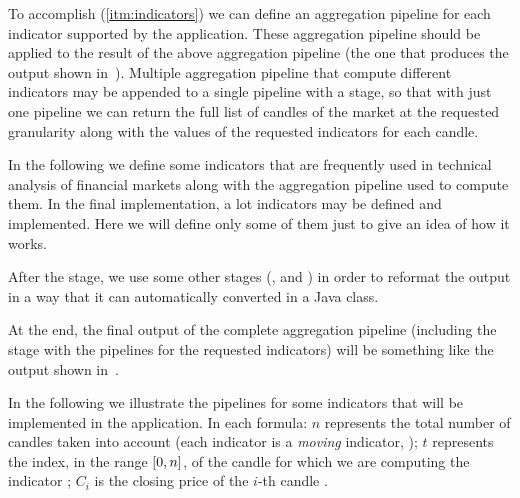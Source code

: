 

To accomplish (\ref{itm:indicators}) we can define an aggregation pipeline for
each indicator supported by the application. These aggregation pipeline should
be applied to the result of the above aggregation pipeline (the one that
produces the output shown in~). Multiple
aggregation pipeline that compute different indicators may be appended to a
single pipeline with a  stage, so that with just one pipeline we
can return the full list of candles of the market at the requested granularity
along with the values of the requested indicators for each candle.

In the following we define some indicators that are frequently used in technical
analysis of financial markets along with the aggregation pipeline used to
compute them. In the final implementation, a lot indicators may be defined and
implemented. Here we will define only some of them just to give an idea of how
it works.

After the  stage, we use some other stages (,
 and ) in order to reformat the output in a
way that it can automatically converted in a Java class.

At the end, the final output of the complete aggregation pipeline (including the
 stage with the pipelines for the requested indicators) will be
something like the output shown in~.



In the following we illustrate the pipelines for some indicators that will be
implemented in the application. In each formula: \(n\) represents the total
number of candles taken into account (each indicator is a \emph{moving}
indicator, ); \(t\) represents the index, in the range
\(\interval{0}{n}\), of the candle for which we are computing the indicator
; \(C_i\) is the
closing price of the \(i\)-th candle .

